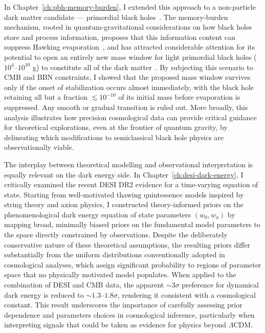 In Chapter~\ref{ch:pbh-memory-burden}, I extended this approach to a non-particle dark matter candidate --- primordial black holes~\cite{Zeldovich:1967lct, Hawking:1971ei, Chapline:1975ojl}. The memory-burden mechanism, rooted in quantum-gravitational considerations on how black holes store and process information, proposes that this information content can suppress Hawking evaporation~\cite{Dvali:2018xpy, Dvali:2018ytn, Dvali:2020wft}, and has attracted considerable attention for its potential to open an entirely new mass window for light primordial black holes ($10^4$--$10^{10}$ g) to constitute all of the dark matter~\cite{Alexandre:2024nuo, Dvali:2024hsb, Thoss:2024hsr}. By subjecting this scenario to CMB and BBN constraints, I showed that the proposed mass window survives only if the onset of stabilization occurs almost immediately, with the black hole retaining all but a fraction $\lesssim 10^{-10}$  of its initial mass before evaporation is suppressed. Any smooth or gradual transition is ruled out.  More broadly, this analysis illustrates how precision cosmological data can provide critical guidance for theoretical explorations, even at the frontier of quantum gravity, by delineating which modifications to semiclassical black hole physics are observationally viable.

The interplay between theoretical modelling and observational interpretation is equally relevant on the dark energy side. In Chapter~\ref{ch:desi-dark-energy}, I critically examined the recent DESI DR2 evidence for a time-varying equation of state. Starting from well-motivated thawing quintessence models inspired by string theory and axion physics, I constructed theory-informed priors on the phenomenological dark energy equation of state parameters $(w_0, w_a)$ by mapping broad, minimally biased priors on the fundamental model parameters to the space directly constrained by observations. Despite the deliberately conservative nature of these theoretical assumptions, the resulting priors differ substantially from the uniform distributions conventionally adopted in cosmological analyses, which assign significant probability to regions of parameter space that no physically motivated model populates. When applied to the combination of DESI and CMB data, the apparent $\sim 3\sigma$ preference for dynamical dark energy is reduced to $\sim 1.3$--$1.8\sigma$, rendering it consistent with a cosmological constant. This result underscores the importance of carefully assessing prior dependence and parameters choices in cosmological inference, particularly when interpreting signals that could be taken as evidence for physics beyond $\Lambda
$CDM.

